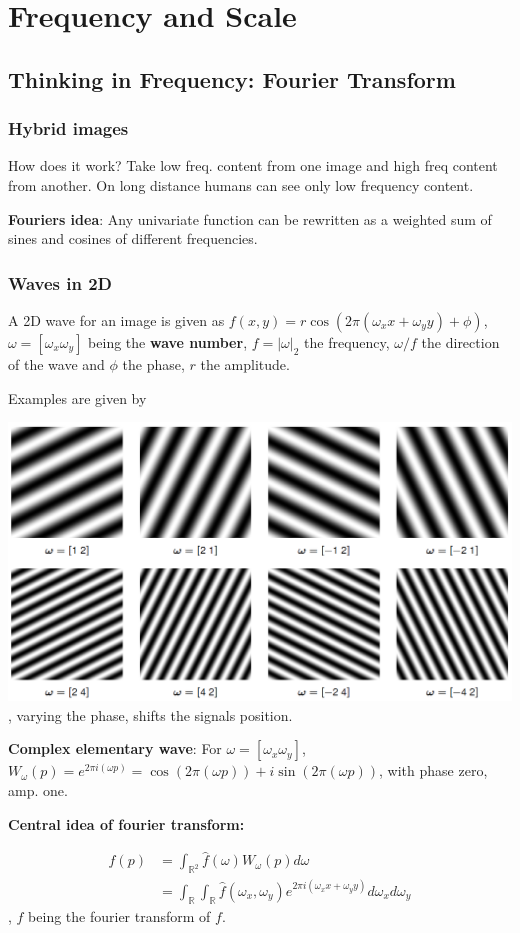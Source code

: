 \chapter{Frequency and Scale}

\section{Thinking in Frequency: Fourier Transform}
\subsection{Hybrid images}
How does it work? Take low freq. content from one image and high freq content from another. On long distance humans can see only low frequency content.

\textbf{Fouriers idea}: Any univariate function can be rewritten as a weighted sum of sines and cosines of different frequencies.

\subsection{Waves in 2D} A 2D wave for an image is given as $f(x,y) = r \cos(2\pi (\omega_x x + \omega_y y) + \phi)$, $\omega = [\omega_x \omega_y]$ being the \textbf{wave number}, $f = |\omega|_2$ the frequency, $\omega /f$ the direction of the wave and $\phi$ the phase, $r$ the amplitude. 

Examples are given by

\includegraphics[width=.7\textwidth]{images/chap4/freq_examples}, varying the phase, shifts the signals position.

\textbf{Complex elementary wave}: For $\omega = [\omega_x \omega_y]$, $W_\omega (p) = e^{2\pi i (\omega p)} = \cos(2\pi(\omega p)) + i \sin(2\pi (\omega p))$, with phase zero, amp. one.

\textbf{Central idea of fourier transform:}

\begin{align*}
    f(p) & = \int_{\mathbb{R}^2} \hat{f}(\omega) W_\omega (p) d\omega \\
    & = \int_{\mathbb{R}}\int_{\mathbb{R}} \hat{f} (\omega_x, \omega_y) e^{2\pi i(\omega_x x + \omega_y y)} d\omega_x d\omega_y
\end{align*}, $\hat{f}$ being the fourier transform of $f$.

